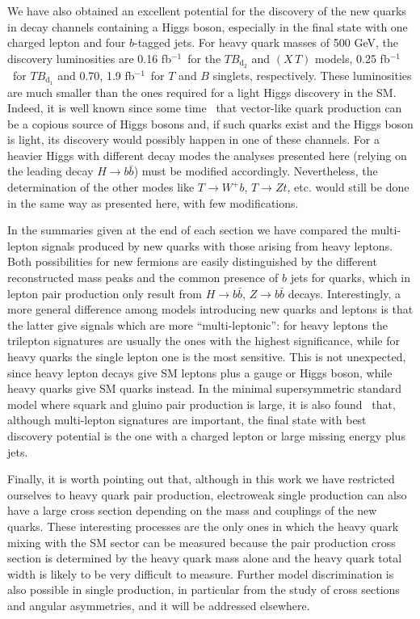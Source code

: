 \documentclass[12pt,a4paper]{article}
\newcommand{\fbin}{fb$^{-1}$}
\newcommand{\TBd}{TB_{\text{d}_1}}
\newcommand{\TBD}{TB_{\text{d}_2}}
\newcommand{\XT}{(X \, T)}
\begin{document}
We have also obtained an excellent potential for the discovery of the new quarks in decay channels containing a Higgs boson, especially in the final state with one charged lepton and four $b$-tagged jets. For heavy quark masses of 500 GeV, the discovery luminosities are
0.16 \fbin\ for the $\TBD$ and $\XT$ models, 0.25 \fbin\ for $\TBd$ and 0.70, 1.9 \fbin\ for $T$ and $B$ singlets, respectively. These luminosities are much smaller than the ones required for a light Higgs discovery in the SM. Indeed, it is well known since some time~\cite{delAguila:1989ba,delAguila:1989rq} that vector-like quark production can be a copious source of Higgs bosons and, if such quarks exist and the Higgs boson is light, its discovery would possibly happen in one of these channels. For a heavier Higgs with different decay modes the analyses presented here (relying on the leading decay $H \to b \bar b$) must be modified accordingly. Nevertheless, the determination of the other modes  like $T \to W^+b$, $T \to Zt$, etc. would still be done in the same way as presented here, with few modifications.

In the summaries given at the end of each section we have compared the multi-lepton signals produced by new quarks with those arising from heavy leptons. Both possibilities for new fermions are easily distinguished by the different reconstructed mass peaks and the common presence of $b$ jets for quarks, which in lepton pair production only result from $H \to b \bar b$, $Z \to b \bar b$ decays.
Interestingly, a more general difference among models introducing new quarks and leptons is that the latter give signals which are more ``multi-leptonic'': for heavy leptons the trilepton signatures are usually the ones with the highest significance, while for heavy quarks the single lepton one is the most sensitive. This is not unexpected, since heavy lepton decays give SM leptons plus a gauge or Higgs boson, while heavy quarks give SM quarks instead. In the minimal supersymmetric standard model where squark and gluino pair production is large, it is also found~\cite{Aad:2009wy} that, although multi-lepton signatures are important, the final state with best discovery potential is the one with a charged lepton or large missing energy plus jets. 

Finally, it is worth pointing out that, although in this work we have restricted ourselves to heavy quark pair production, electroweak single production can also have a large cross section depending on the mass and couplings of the new quarks. These interesting processes are the only ones in which the heavy quark mixing with the SM sector can be measured because the pair production cross section is determined by the heavy quark mass alone and the heavy quark total width is likely to be very difficult to measure. Further model discrimination is also possible in single production, in particular from the study of cross sections and angular asymmetries, and it will be addressed elsewhere.
\end{document}
